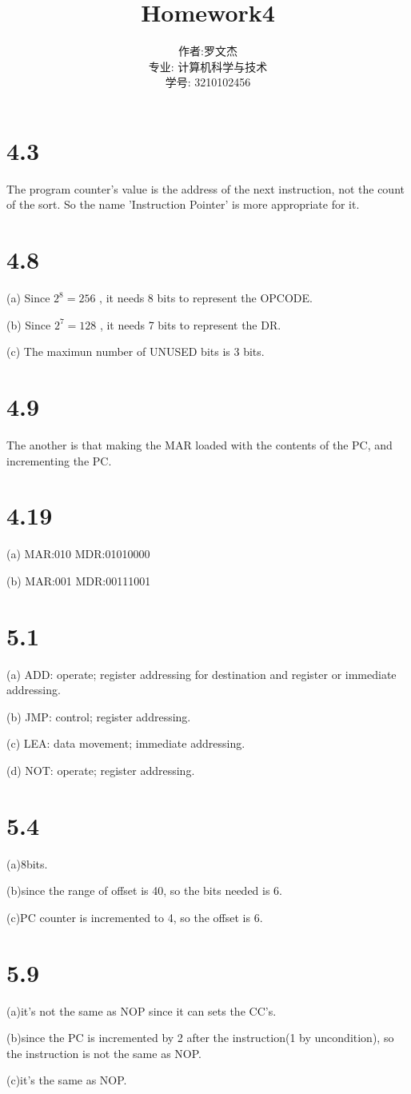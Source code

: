 \documentclass[20pt]{ctexart}
\title{Homework4}
\author{作者:罗文杰\\专业: 计算机科学与技术\\学号: 3210102456}
\date{}
\begin{document}
\maketitle

\section*{4.3}
The program counter's value is the address of the next instruction, not the count of the sort. So the name 'Instruction Pointer' is more appropriate for it.

\section*{4.8}
(a) Since $2^8=256$ , it needs 8 bits to represent the OPCODE.

(b) Since $2^7=128$  , it needs 7 bits to represent the DR.

(c) The maximun number of UNUSED bits is 3 bits.

\section*{4.9}
The another is that making the MAR loaded with the contents of the PC, and incrementing the PC.

\section*{4.19}
(a) MAR:010 MDR:01010000

(b) MAR:001 MDR:00111001

\section*{5.1}
(a) ADD: operate; register addressing for destination and register or immediate addressing.

(b) JMP: control; register addressing.

(c) LEA: data movement; immediate addressing.

(d) NOT: operate; register addressing.

\section*{5.4}
(a)8bits.

(b)since the range of offset is 40, so the bits needed is 6.

(c)PC counter is incremented to 4, so the offset is 6.

\section*{5.9}
(a)it's not the same as NOP since it can sets the CC's.

(b)since the PC is incremented by 2 after the instruction(1 by uncondition), so the instruction is not the same as NOP.

(c)it's the same as NOP.


\end{document}
